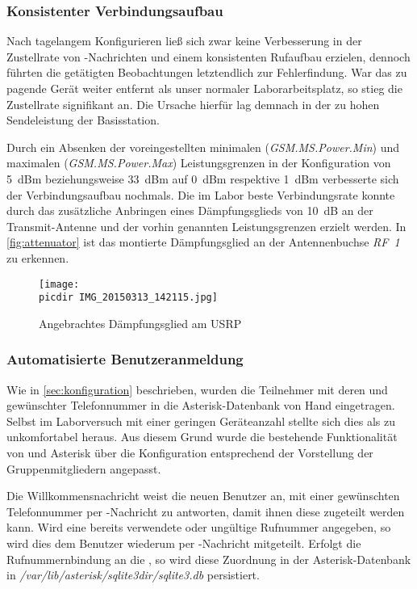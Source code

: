 \subsubsection{Konsistenter Verbindungsaufbau}
Nach tagelangem Konfigurieren ließ sich zwar keine Verbesserung in der Zustellrate von \SMS-Nachrichten und einem konsistenten Rufaufbau erzielen, dennoch führten die getätigten Beobachtungen letztendlich zur Fehlerfindung. War das zu pagende Gerät weiter entfernt als unser normaler Laborarbeitsplatz, so stieg die Zustellrate signifikant an.
Die Ursache hierfür lag demnach in der zu hohen Sendeleistung der Basisstation.

Durch ein Absenken der voreingestellten minimalen (\emph{GSM.MS.Power.Min}) und maximalen (\emph{GSM.MS.Power.Max}) Leistungsgrenzen in der Konfiguration von \SI{5}{dBm} beziehungsweise \SI{33}{dBm} auf \SI{0}{dBm} respektive \SI{1}{dBm} verbesserte sich der Verbindungsaufbau nochmals. 
Die im Labor beste Verbindungsrate konnte durch das zusätzliche Anbringen eines Dämpfungsglieds von \SI{10}{dB} an der Transmit-Antenne und der vorhin genannten Leistungsgrenzen erzielt werden. 
In \autoref{fig:attenuator} ist das montierte Dämpfungsglied an der Antennenbuchse \emph{RF~1} zu erkennen.

\begin{figure}[h!]
	\centering
	\texttt{[image: \\picdir IMG\_20150313\_142115.jpg]}
	\caption{Angebrachtes Dämpfungsglied am \acs*{USRP}}
	\label{fig:attenuator}
\end{figure}


\subsubsection{Automatisierte Benutzeranmeldung}
Wie in \autoref{sec:konfiguration} beschrieben, wurden die Teilnehmer mit deren \IMSI und gewünschter Telefonnummer in die Asterisk-Datenbank von Hand eingetragen. Selbst im Laborversuch mit einer geringen Geräteanzahl stellte sich dies als zu unkomfortabel heraus.
Aus diesem Grund wurde die bestehende Funktionalität von \OpenBTS und Asterisk über die Konfiguration entsprechend der Vorstellung der Gruppenmitgliedern angepasst.

Die Willkommensnachricht weist die neuen Benutzer an, mit einer gewünschten Telefonnummer per \SMS-Nachricht zu antworten, damit ihnen diese zugeteilt werden kann. Wird eine bereits verwendete oder ungültige Rufnummer angegeben, so wird dies dem Benutzer wiederum per \SMS-Nachricht mitgeteilt.
Erfolgt die Rufnummernbindung an die \IMSI, so wird diese Zuordnung in der Asterisk-Datenbank in \emph{/var/lib/asterisk/sqlite3dir/sqlite3.db} persistiert.

